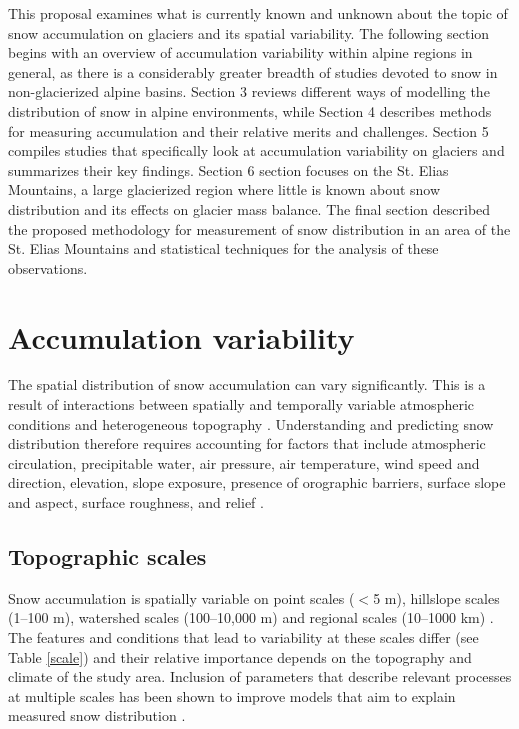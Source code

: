 \documentclass[12pt]{article}
\begin{document}
This proposal examines what is currently known and unknown about the topic of snow accumulation on glaciers and its spatial variability. The following section begins with an overview of accumulation variability within alpine regions in general, as there is a considerably greater breadth of studies devoted to snow in non-glacierized alpine basins. Section 3 reviews different ways of modelling the distribution of snow in alpine environments, while Section 4 describes methods for measuring accumulation and their relative merits and challenges. Section 5 compiles studies that specifically look at accumulation variability on glaciers and summarizes their key findings. Section 6 section focuses on the St. Elias Mountains, a large glacierized region where little is known about snow distribution and its effects on glacier mass balance. The final section described the proposed methodology for measurement of snow distribution in an area of the St. Elias Mountains and statistical techniques for the analysis of these observations. 

\section{Accumulation variability}

The spatial distribution of snow accumulation can vary significantly. This is a result of interactions between spatially and temporally variable atmospheric conditions and heterogeneous topography \citep{Deems2006, Liston2006}. Understanding and predicting snow distribution therefore requires accounting for factors that include atmospheric circulation, precipitable water, air pressure, air temperature, wind speed and direction, elevation, slope exposure, presence of orographic barriers, surface slope and aspect, surface roughness, and relief \citep{Schweizer2008a,McGrath2015}.

\subsection{Topographic scales}
Snow accumulation is spatially variable on point scales ($<$5 m), hillslope scales (1--100 m), watershed scales (100--10,000 m) and regional scales (10--1000 km) \citep{Clark2011}. The features and conditions that lead to variability at these scales differ (see Table \ref{scale}) and their relative importance depends on the topography and climate of the study area. Inclusion of parameters that describe relevant processes at multiple scales has been shown to improve models that aim to explain measured snow distribution \citep{Marchand2005, Clark2011}. 
\end{document}
